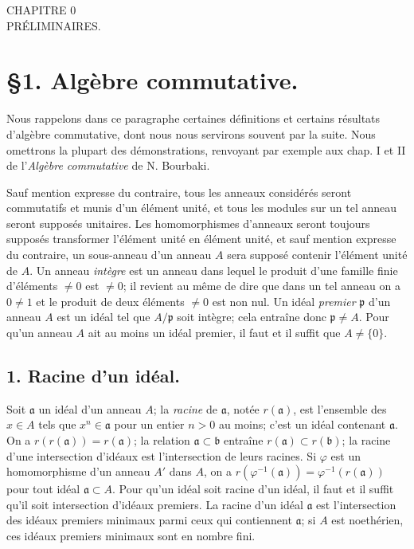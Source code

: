 

\begin{center}
CHAPITRE 0\\
PRÉLIMINAIRES.
\end{center}

\section*{§1. Algèbre commutative.}

Nous rappelons dans ce paragraphe certaines définitions et certains résultats d'algèbre commutative, dont nous nous servirons souvent par la suite. Nous omettrons la plupart des démonstrations, renvoyant par exemple aux chap. I et II de l'\emph{Algèbre commutative} de N. Bourbaki.

Sauf mention expresse du contraire, tous les anneaux considérés seront commutatifs et munis d'un élément unité, et tous les modules sur un tel anneau seront supposés unitaires. Les homomorphismes d'anneaux seront toujours supposés transformer l'élément unité en élément unité, et sauf mention expresse du contraire, un sous-anneau d'un anneau $A$ sera supposé contenir l'élément unité de $A$. Un anneau \emph{intègre} est un anneau dans lequel le produit d'une famille finie d'éléments $\neq 0$ est $\neq 0$; il revient au même de dire que dans un tel anneau on a $0 \neq 1$ et le produit de deux éléments $\neq 0$ est non nul. Un idéal \emph{premier} $\mathfrak{p}$ d'un anneau $A$ est un idéal tel que $A/\mathfrak{p}$ soit intègre; cela entraîne donc $\mathfrak{p} \neq A$. Pour qu'un anneau $A$ ait au moins un idéal premier, il faut et il suffit que $A \neq \{0\}$.

\subsection*{1. Racine d'un idéal.}

Soit $\mathfrak{a}$ un idéal d'un anneau $A$; la \emph{racine} de $\mathfrak{a}$, notée $r(\mathfrak{a})$, est l'ensemble des $x \in A$ tels que $x^n \in \mathfrak{a}$ pour un entier $n > 0$ au moins; c'est un idéal contenant $\mathfrak{a}$. On a $r(r(\mathfrak{a})) = r(\mathfrak{a})$; la relation $\mathfrak{a} \subset \mathfrak{b}$ entraîne $r(\mathfrak{a}) \subset r(\mathfrak{b})$; la racine d'une intersection d'idéaux est l'intersection de leurs racines. Si $\varphi$ est un homomorphisme d'un anneau $A'$ dans $A$, on a $r(\varphi^{-1}(\mathfrak{a})) = \varphi^{-1}(r(\mathfrak{a}))$ pour tout idéal $\mathfrak{a} \subset A$. Pour qu'un idéal soit racine d'un idéal, il faut et il suffit qu'il soit intersection d'idéaux premiers. La racine d'un idéal $\mathfrak{a}$ est l'intersection des idéaux premiers minimaux parmi ceux qui contiennent $\mathfrak{a}$; si $A$ est noethérien, ces idéaux premiers minimaux sont en nombre fini.

